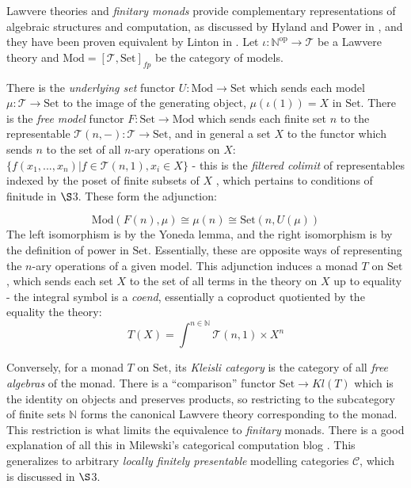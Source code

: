 \documentclass[a4paper,UKenglish]{article}
\theoremstyle{definition}
\def\ld{\rotatebox[origin=c]{-90}{$\dashv$}} %
\newcommand{\Set}{\mathrm{Set}}
\newcommand{\Mod}{\mathrm{Mod}}
\newcommand{\op}{\mathrm{op}}
\newcommand{\NN}{\mathbb{N}}
\newcommand{\C}{\mathscr{C}}
\newcommand{\T}{\mathscr{T}}
\begin{document}
Lawvere theories and \textit{finitary monads} provide complementary representations of algebraic structures and computation, as discussed by Hyland and Power in \cite{ltam}, and they have been proven equivalent by Linton in \cite{linton}. Let $\iota: \NN^\op \to \T$ be a Lawvere theory and $\Mod = [\T,\Set]_{fp}$ be the category of models.

\begin{center}
\end{center}

There is the \textit{underlying set} functor $U:\Mod \to \Set$ which sends each model $\mu: \T \to \Set$ to the image of the generating object, $\mu(\iota(1)) = X$ in $\Set$. There is the \textit{free model} functor $F:\Set \to \Mod$ which sends each finite set $n$ to the representable $\T(n,-):\T \to \Set$, and in general a set $X$ to the functor which sends $n$ to the set of all $n$-ary operations on $X$: $\{f(x_1,...,x_n)|f\in \T(n,1), x_i\in X\}$ - this is the \textit{filtered colimit} of representables indexed by the poset of finite subsets of $X$ \cite{nlab}, which pertains to conditions of finitude in $\S$3. These form the adjunction:

$$\Mod(F(n),\mu) \cong \mu(n) \cong \Set(n,U(\mu))$$ The left isomorphism is by the Yoneda lemma, and the right isomorphism is by the definition of power in $\Set$. Essentially, these are opposite ways of representing the $n$-ary operations of a given model. This adjunction induces a monad $T$ on $\Set$, which sends each set $X$ to the set of all terms in the theory on $X$ up to equality - the integral symbol is a \textit{coend}, essentially a coproduct quotiented by the equality the theory: $$T(X) = \int^{n\in \NN} \T(n,1) \times X^n$$

Conversely, for a monad $T$ on $\Set$, its \textit{Kleisli category} is the category of all \textit{free algebras} of the monad. There is a ``comparison'' functor $\Set \to Kl(T)$ which is the identity on objects and preserves products, so restricting to the subcategory of finite sets $\NN$ forms the canonical Lawvere theory corresponding to the monad. This restriction is what limits the equivalence to \textit{finitary} monads. There is a good explanation of all this in Milewski's categorical computation blog \cite{milew}. This generalizes to arbitrary \textit{locally finitely presentable} modelling categories $\C$, which is discussed in $\S$3.
\end{document}
